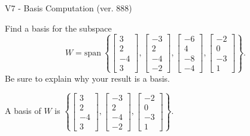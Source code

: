 \begin{exercise}
  \begin{exerciseTitle}V7 - Basis Computation (ver. 888)\end{exerciseTitle}
  \begin{exerciseStatement}
    Find a basis for the subspace 
\[W=\mathrm{span}\ \left\{\left[\begin{array}{r}
3 \\
2 \\
-4 \\
3
\end{array}\right] , \left[\begin{array}{r}
-3 \\
2 \\
-4 \\
-2
\end{array}\right] , \left[\begin{array}{r}
-6 \\
4 \\
-8 \\
-4
\end{array}\right] , \left[\begin{array}{r}
-2 \\
0 \\
-3 \\
1
\end{array}\right]\right\}.\]
 Be sure to explain why your result is a basis.


  \end{exerciseStatement}
  \begin{exerciseAnswer}
   A basis of \(W\) is  \(\left\{\left[\begin{array}{r}
3 \\
2 \\
-4 \\
3
\end{array}\right] , \left[\begin{array}{r}
-3 \\
2 \\
-4 \\
-2
\end{array}\right] , \left[\begin{array}{r}
-2 \\
0 \\
-3 \\
1
\end{array}\right]\right\}\).
  


  \end{exerciseAnswer}
\end{exercise}